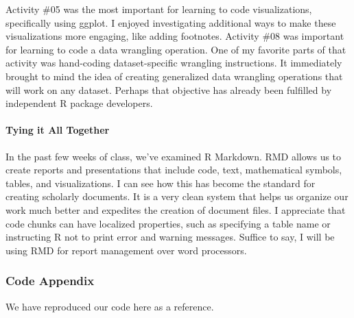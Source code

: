 \documentclass[
]{article}
\begin{document}
Activity \#05 was the most important for learning to code
visualizations, specifically using ggplot. I enjoyed investigating
additional ways to make these visualizations more engaging, like adding
footnotes. Activity \#08 was important for learning to code a data
wrangling operation. One of my favorite parts of that activity was
hand-coding dataset-specific wrangling instructions. It immediately
brought to mind the idea of creating generalized data wrangling
operations that will work on any dataset. Perhaps that objective has
already been fulfilled by independent R package developers.

\hypertarget{tying-it-all-together}{%
\paragraph{Tying it All Together}\label{tying-it-all-together}}

In the past few weeks of class, we've examined R Markdown. RMD allows us
to create reports and presentations that include code, text,
mathematical symbols, tables, and visualizations. I can see how this has
become the standard for creating scholarly documents. It is a very clean
system that helps us organize our work much better and expedites the
creation of document files. I appreciate that code chunks can have
localized properties, such as specifying a table name or instructing R
not to print error and warning messages. Suffice to say, I will be using
RMD for report management over word processors.

\newpage

\hypertarget{code-appendix}{%
\subsubsection{Code Appendix}\label{code-appendix}}

We have reproduced our code here as a reference.
\end{document}
